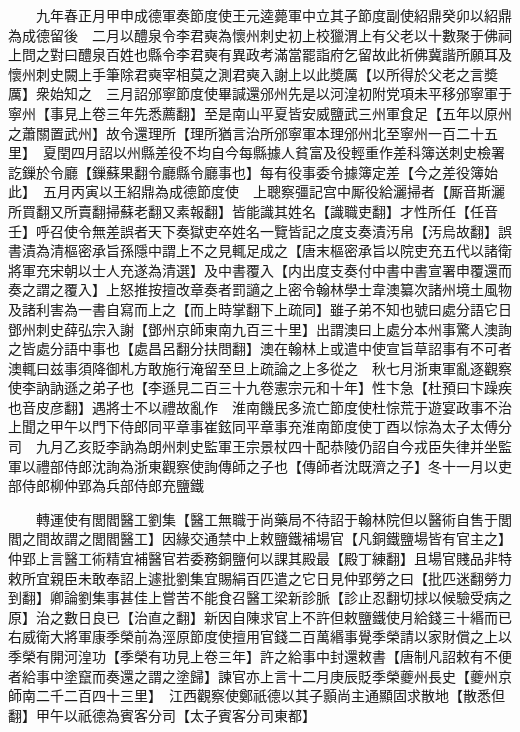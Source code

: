 　　九年春正月甲申成德軍奏節度使王元逵薨軍中立其子節度副使紹鼎癸卯以紹鼎為成德留後　二月以醴泉令李君奭為懷州刺史初上校獵渭上有父老以十數聚于佛祠上問之對曰醴泉百姓也縣令李君奭有異政考滿當罷詣府乞留故此祈佛冀諧所願耳及懷州刺史闕上手筆除君奭宰相莫之測君奭入謝上以此奬厲【以所得於父老之言奬厲】衆始知之　三月詔邠寧節度使畢諴還邠州先是以河湟初附党項未平移邠寧軍于寧州【事見上卷三年先悉薦翻】至是南山平夏皆安威鹽武三州軍食足【五年以原州之蕭關置武州】故令還理所【理所猶言治所邠寧軍本理邠州北至寧州一百二十五里】　夏閏四月詔以州縣差役不均自今每縣據人貧富及役輕重作差科簿送刺史檢署訖鏁於令廳【鏁蘇果翻令廳縣令廳事也】每有役事委令據簿定差【今之差役簿始此】　五月丙寅以王紹鼎為成德節度使　上聰察彊記宫中厮役給灑掃者【厮音斯灑所買翻又所賣翻掃蘇老翻又素報翻】皆能識其姓名【識職吏翻】才性所任【任音壬】呼召使令無差誤者天下奏獄吏卒姓名一覽皆記之度支奏漬汚帛【汚烏故翻】誤書漬為清樞密承旨孫隱中謂上不之見輒足成之【唐末樞密承旨以院吏充五代以諸衛將軍充宋朝以士人充遂為清選】及中書覆入【内出度支奏付中書中書宣署申覆還而奏之謂之覆入】上怒推按擅改章奏者罰讁之上密令翰林學士韋澳纂次諸州境土風物及諸利害為一書自寫而上之【而上時掌翻下上疏同】雖子弟不知也號曰處分語它日鄧州刺史薛弘宗入謝【鄧州京師東南九百三十里】出謂澳曰上處分本州事驚人澳詢之皆處分語中事也【處昌呂翻分扶問翻】澳在翰林上或遣中使宣旨草詔事有不可者澳輒曰兹事須降御札方敢施行淹留至旦上疏論之上多從之　秋七月浙東軍亂逐觀察使李訥訥遜之弟子也【李遜見二百三十九卷憲宗元和十年】性卞急【杜預曰卞躁疾也音皮彦翻】遇將士不以禮故亂作　淮南饑民多流亡節度使杜悰荒于遊宴政事不治上聞之甲午以門下侍郎同平章事崔鉉同平章事充淮南節度使丁酉以悰為太子太傅分司　九月乙亥貶李訥為朗州刺史監軍王宗景杖四十配恭陵仍詔自今戎臣失律并坐監軍以禮部侍郎沈詢為浙東觀察使詢傳師之子也【傳師者沈既濟之子】冬十一月以吏部侍郎柳仲郢為兵部侍郎充鹽鐵

　　轉運使有閭閻醫工劉集【醫工無職于尚藥局不待詔于翰林院但以醫術自售于閭閻之間故謂之閭閻醫工】因緣交通禁中上敕鹽鐵補場官【凡銅鐵鹽場皆有官主之】仲郢上言醫工術精宜補醫官若委務銅鹽何以課其殿最【殿丁練翻】且場官賤品非特敕所宜親臣未敢奉詔上遽批劉集宜賜絹百匹遣之它日見仲郢勞之曰【批匹迷翻勞力到翻】卿論劉集事甚佳上嘗苦不能食召醫工梁新診脈【診止忍翻切捄以候驗受病之原】治之數日良已【治直之翻】新因自陳求官上不許但敕鹽鐵使月給錢三十緡而已右威衛大將軍康季榮前為涇原節度使擅用官錢二百萬緡事覺季榮請以家財償之上以季榮有開河湟功【季榮有功見上卷三年】許之給事中封還敕書【唐制凡詔敕有不便者給事中塗竄而奏還之謂之塗歸】諫官亦上言十二月庚辰貶季榮夔州長史【夔州京師南二千二百四十三里】　江西觀察使鄭祇德以其子顥尚主通顯固求散地【散悉但翻】甲午以祇德為賓客分司【太子賓客分司東都】

